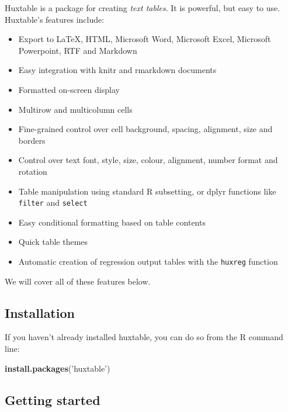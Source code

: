 \documentclass[]{article}
\newenvironment{Shaded}{\begin{snugshade}}{\end{snugshade}}
\newcommand{\KeywordTok}[1]{\textcolor[rgb]{0.13,0.29,0.53}{\textbf{#1}}}
\newcommand{\NormalTok}[1]{#1}
\newcommand{\StringTok}[1]{\textcolor[rgb]{0.31,0.60,0.02}{#1}}
\providecommand{\tightlist}{%
  \setlength{\itemsep}{0pt}\setlength{\parskip}{0pt}}
\begin{document}
Huxtable is a package for creating \emph{text tables}. It is powerful,
but easy to use. Huxtable's features include:

\begin{itemize}
\tightlist
\item
  Export to LaTeX, HTML, Microsoft Word, Microsoft Excel, Microsoft
  Powerpoint, RTF and Markdown
\item
  Easy integration with knitr and rmarkdown documents
\item
  Formatted on-screen display
\item
  Multirow and multicolumn cells
\item
  Fine-grained control over cell background, spacing, alignment, size
  and borders
\item
  Control over text font, style, size, colour, alignment, number format
  and rotation
\item
  Table manipulation using standard R subsetting, or dplyr functions
  like \texttt{filter} and \texttt{select}
\item
  Easy conditional formatting based on table contents
\item
  Quick table themes
\item
  Automatic creation of regression output tables with the
  \texttt{huxreg} function
\end{itemize}

We will cover all of these features below.

\hypertarget{installation}{%
\subsection{Installation}\label{installation}}

If you haven't already installed huxtable, you can do so from the R
command line:

\begin{Shaded}
\begin{Highlighting}[]
\KeywordTok{install.packages}\NormalTok{(}\StringTok{'huxtable'}\NormalTok{)}
\end{Highlighting}
\end{Shaded}

\FloatBarrier

\hypertarget{getting-started}{%
\subsection{Getting started}\label{getting-started}}
\end{document}
